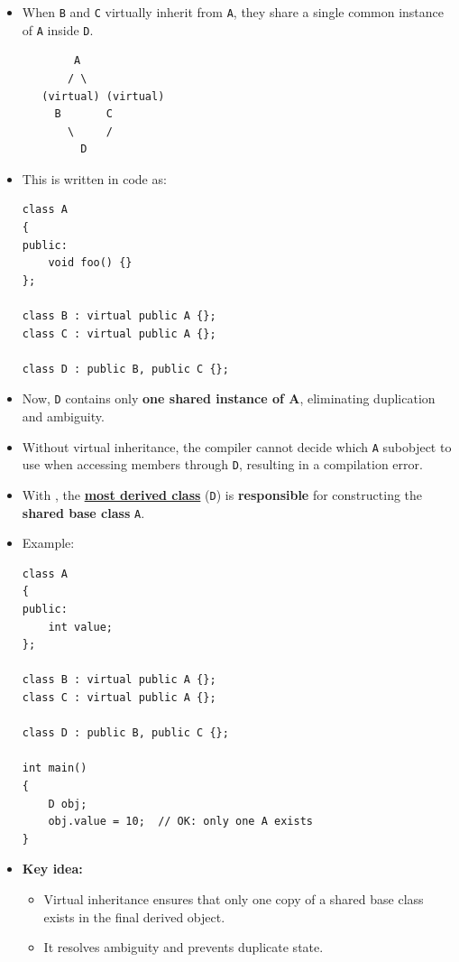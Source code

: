 \documentclass[10pt]{article}
\newcommand{\vocab}[1]{\fbox{\textbf{\textit{#1}}}}
\begin{document}
\begin{itemize}
	\item When \texttt{B} and \texttt{C} virtually inherit from \texttt{A}, they share a single common instance of \texttt{A} inside \texttt{D}.

\begin{verbatim}
        A
       / \
   (virtual) (virtual)
     B       C
       \     /
         D
\end{verbatim}

	\item This is written in code as:

\begin{verbatim}
class A
{
public:
    void foo() {}
};

class B : virtual public A {};
class C : virtual public A {};

class D : public B, public C {};
\end{verbatim}

	\item Now, \texttt{D} contains only \textbf{one shared instance of A}, eliminating duplication and ambiguity.

	\item Without virtual inheritance, the compiler cannot decide which \texttt{A} subobject to use when accessing members through \texttt{D}, resulting in a compilation error.

\item With \vocab{virtual inheritance}, the \underline{\textbf{most derived class}} (\texttt{D}) is \textbf{responsible} for constructing the \textbf{shared base class} \texttt{A}.

	\item Example:

\begin{verbatim}
class A
{
public:
    int value;
};

class B : virtual public A {};
class C : virtual public A {};

class D : public B, public C {};

int main()
{
    D obj;
    obj.value = 10;  // OK: only one A exists
}
\end{verbatim}

	\item \textbf{Key idea:}
	\begin{itemize}
		\item Virtual inheritance ensures that only one copy of a shared base class exists in the final derived object.
		\item It resolves ambiguity and prevents duplicate state.
	\end{itemize}


\end{itemize}
\end{document}
